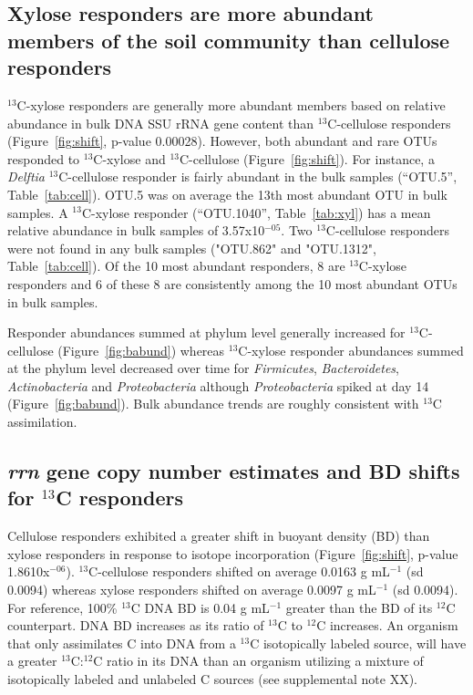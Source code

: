 \subsection{Xylose responders are more abundant members of the soil community
than cellulose responders}
$^{13}$C-xylose responders are generally more abundant members based on
relative abundance in bulk DNA SSU rRNA gene content than $^{13}$C-cellulose
responders (Figure~\ref{fig:shift}, p-value 0.00028).  However, both abundant
and rare OTUs responded to $^{13}$C-xylose and $^{13}$C-cellulose
(Figure~\ref{fig:shift}). For instance, a \textit{Delftia} $^{13}$C-cellulose
responder is fairly abundant in the bulk samples (``OTU.5'',
Table~\ref{tab:cell}). OTU.5 was on average the 13th most abundant OTU in bulk
samples. A $^{13}$C-xylose responder (``OTU.1040'', Table~\ref{tab:xyl}) has a
mean relative abundance in bulk samples of 3.57x10$^{-05}$. Two
$^{13}$C-cellulose responders were not found in any bulk samples ("OTU.862" and
"OTU.1312", Table~\ref{tab:cell}). Of the 10 most abundant responders, 8 are
$^{13}$C-xylose responders and 6 of these 8 are consistently among the 10 most
abundant OTUs in bulk samples.

Responder abundances summed at phylum level generally increased for
$^{13}$C-cellulose (Figure~\ref{fig:babund}) whereas $^{13}$C-xylose
responder abundances summed at the phylum level decreased over time for
\textit{Firmicutes}, \textit{Bacteroidetes}, \textit{Actinobacteria} and
\textit{Proteobacteria} although \textit{Proteobacteria} spiked at day 14
(Figure~\ref{fig:babund}). Bulk abundance trends are roughly consistent
with $^{13}$C assimilation.

\subsection{\textit{rrn} gene copy number estimates and BD shifts for
$^{13}$C responders} 
Cellulose responders exhibited a greater shift in buoyant density (BD) than
xylose responders in response to isotope incorporation (Figure~\ref{fig:shift},
p-value 1.8610x$^{-06}$). $^{13}$C-cellulose responders shifted on average
0.0163 g mL$^{-1}$ (sd 0.0094) whereas xylose responders shifted on average
0.0097 g mL$^{-1}$ (sd 0.0094). For reference, 100\% $^{13}$C DNA BD is 0.04
g mL$^{-1}$ greater than the BD of its $^{12}$C counterpart. DNA BD increases
as its ratio of $^{13}$C to $^{12}$C increases. An organism that only
assimilates C into DNA from a $^{13}$C isotopically labeled source, will have
a greater $^{13}$C:$^{12}$C ratio in its DNA than an organism utilizing
a mixture of isotopically labeled and unlabeled C sources (see supplemental
note XX). 

